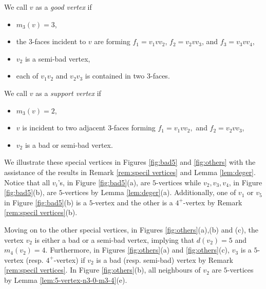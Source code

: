 \documentclass[12pt, reqno]{amsart}
\theoremstyle{plain}
\theoremstyle{definition}
\numberwithin{equation}{section}
\begin{document}
We call $v$ as a \emph{good vertex} if 
\begin{itemize}
\item $m_3(v)= 3$,
\item the $3$-faces incident to $v$ are forming $f_1=v_1vv_2$, $f_2=v_2vv_3$, and $f_3=v_3vv_4$,
\item $v_2$ is a semi-bad vertex,
\item each of $v_1v_2$ and $v_2v_3$ is contained in two $3$-faces. 
\end{itemize}

We call $v$ as a \emph{support vertex}  if 
\begin{itemize}
\item $m_3(v)=2$,
\item $v$ is incident to two adjacent $3$-faces forming $f_1=v_1vv_2,$ and $f_2=v_2vv_3$,
\item $v_2$ is a bad or semi-bad vertex.
\end{itemize}



We illustrate these special vertices in  Figures \ref{fig:bad5} and  \ref{fig:others} with the assistance of the results in Remark \ref{rem:specil vertices} and Lemma \ref{lem:deger}. Notice that all $v_i$'s, in Figure \ref{fig:bad5}(a), are $5$-vertices while $v_2,v_3,v_4$, in Figure \ref{fig:bad5}(b), are  $5$-vertices by Lemma \ref{lem:deger}(a). Additionally, one of $v_1$ or $v_5$ in Figure \ref{fig:bad5}(b) is  a $5$-vertex and the other is a $4^+$-vertex by Remark \ref{rem:specil vertices}(b).

Moving on to the other special vertices, in Figures \ref{fig:others}(a),(b) and (c), the vertex $v_2$ is either a bad or a semi-bad vertex, implying that $d(v_2) = 5$ and $m_4(v_2) = 4$. Furthermore, in Figures \ref{fig:others}(a) and \ref{fig:others}(c), $v_3$ is a $5$-vertex (resp. $4^+$-vertex) if $v_2$ is a bad (resp. semi-bad) vertex by Remark \ref{rem:specil vertices}.  In Figure \ref{fig:others}(b), all neighbours of $v_2$ are $5$-vertices by Lemma \ref{lem:5-vertex-n3-0-m3-4}(e).
\end{document}

